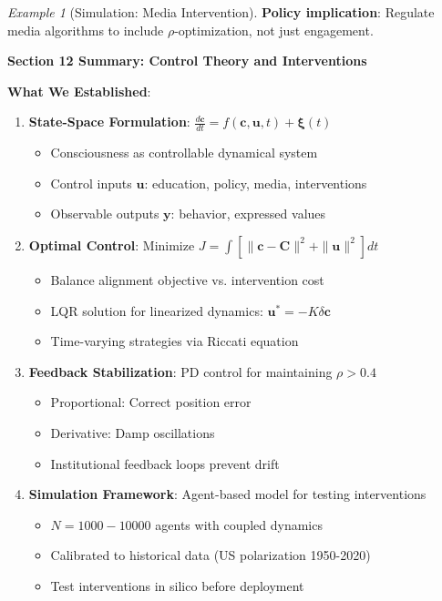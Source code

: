 \documentclass[11pt,a4paper]{article}
\theoremstyle{definition}
\theoremstyle{remark}
\newtheorem{example}{Example}[section]
\newcommand{\cc}{\mathbf{c}}
\begin{document}
\begin{enumerate}
\begin{example}[Simulation: Media Intervention]
\textbf{Policy implication}: Regulate media algorithms to include \(\rho\)-optimization, not just engagement.
\end{example}

\begin{mdframed}[backgroundcolor=green!10,linewidth=2pt,linecolor=green!70!black]
\textbf{Section 12 Summary: Control Theory and Interventions}

\textbf{What We Established}:
\begin{enumerate}[nosep]
    \item \textbf{State-Space Formulation}: \(\frac{d\cc}{dt} = f(\cc, \mathbf{u}, t) + \boldsymbol{\xi}(t)\)
        \begin{itemize}[nosep]
            \item Consciousness as controllable dynamical system
            \item Control inputs \(\mathbf{u}\): education, policy, media, interventions
            \item Observable outputs \(\mathbf{y}\): behavior, expressed values
        \end{itemize}
    
    \item \textbf{Optimal Control}: Minimize \(J = \int [\|\cc - \mathbf{C}\|^2 + \|\mathbf{u}\|^2] dt\)
        \begin{itemize}[nosep]
            \item Balance alignment objective vs. intervention cost
            \item LQR solution for linearized dynamics: \(\mathbf{u}^* = -K\delta\cc\)
            \item Time-varying strategies via Riccati equation
        \end{itemize}
    
    \item \textbf{Feedback Stabilization}: PD control for maintaining \(\rho > 0.4\)
        \begin{itemize}[nosep]
            \item Proportional: Correct position error
            \item Derivative: Damp oscillations
            \item Institutional feedback loops prevent drift
        \end{itemize}
    
    \item \textbf{Simulation Framework}: Agent-based model for testing interventions
        \begin{itemize}[nosep]
            \item \(N = 1000-10000\) agents with coupled dynamics
            \item Calibrated to historical data (US polarization 1950-2020)
            \item Test interventions in silico before deployment
        \end{itemize}
\end{enumerate}


\end{mdframed}
\end{enumerate}
\end{document}
